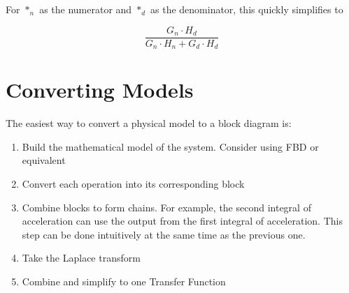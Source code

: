 \documentclass{../templates/topic}
\begin{document}
For $*_n$ as the numerator and $*_d$ as the denominator, this quickly simplifies to

\begin{equation}
	\frac{G_n\cdot H_d}{G_n\cdot H_n + G_d\cdot H_d}
\end{equation}

\section{Converting Models}

The easiest way to convert a physical model to a block diagram is:
\begin{enumerate}
	\item Build the mathematical model of the system. Consider using FBD or equivalent
	\item Convert each operation into its corresponding block
	\item Combine blocks to form chains. For example, the second integral of acceleration can use the output from the first integral of acceleration. This step can be done intuitively at the same time as the previous one.
	\item Take the Laplace transform
	\item Combine and simplify to one Transfer Function
\end{enumerate}
\end{document}
